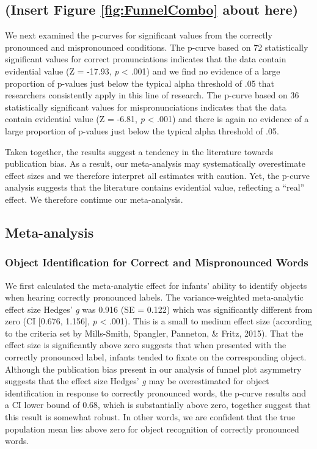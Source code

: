 \documentclass[man]{apa6}
\begin{document}
\hypertarget{insert-figure-reffigfunnelcombo-about-here}{%
\subsection{(Insert Figure \ref{fig:FunnelCombo} about here)}\label{insert-figure-reffigfunnelcombo-about-here}}

We next examined the p-curves for significant values from the correctly pronounced and mispronounced conditions. The p-curve based on 72 statistically significant values for correct pronunciations indicates that the data contain evidential value (Z = -17.93, \emph{p} \textless{} .001) and we find no evidence of a large proportion of p-values just below the typical alpha threshold of .05 that researchers consistently apply in this line of research. The p-curve based on 36 statistically significant values for mispronunciations indicates that the data contain evidential value (Z = -6.81, \emph{p} \textless{} .001) and there is again no evidence of a large proportion of p-values just below the typical alpha threshold of .05.

Taken together, the results suggest a tendency in the literature towards publication bias. As a result, our meta-analysis may systematically overestimate effect sizes and we therefore interpret all estimates with caution. Yet, the p-curve analysis suggests that the literature contains evidential value, reflecting a \enquote{real} effect. We therefore continue our meta-analysis.

\hypertarget{meta-analysis-1}{%
\subsection{Meta-analysis}\label{meta-analysis-1}}

\hypertarget{object-identification-for-correct-and-mispronounced-words}{%
\subsubsection{Object Identification for Correct and Mispronounced Words}\label{object-identification-for-correct-and-mispronounced-words}}

We first calculated the meta-analytic effect for infants' ability to identify objects when hearing correctly pronounced labels. The variance-weighted meta-analytic effect size Hedges' \emph{g} was 0.916 (SE = 0.122) which was significantly different from zero (CI {[}0.676, 1.156{]}, \emph{p} \textless{} .001). This is a small to medium effect size (according to the criteria set by Mills-Smith, Spangler, Panneton, \& Fritz, 2015). That the effect size is significantly above zero suggests that when presented with the correctly pronounced label, infants tended to fixate on the corresponding object. Although the publication bias present in our analysis of funnel plot asymmetry suggests that the effect size Hedges' \emph{g} may be overestimated for object identification in response to correctly pronounced words, the p-curve results and a CI lower bound of 0.68, which is substantially above zero, together suggest that this result is somewhat robust. In other words, we are confident that the true population mean lies above zero for object recognition of correctly pronounced words.
\end{document}
